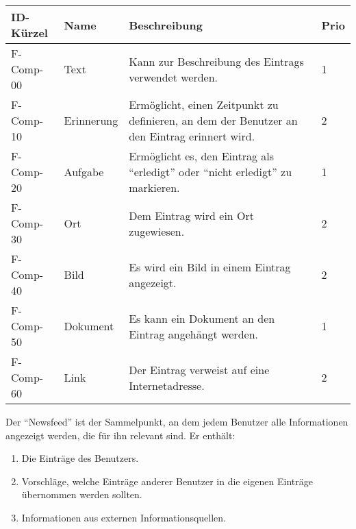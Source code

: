 \begin{tabularx}{\textwidth}{|l|l|X|l|}
    \toprule
    \textbf{ID-Kürzel} & \textbf{Name} & \textbf{Beschreibung} & \textbf{Prio}\\
    \midrule
    \endhead
    \hline
    \caption{Typen von Komponenten}
    \label{funktionen:typen}
    \endfoot
    F-Comp-00 & Text & Kann zur Beschreibung des Eintrags verwendet werden. & 1\\
    F-Comp-10 & Erinnerung & Ermöglicht, einen Zeitpunkt zu definieren, an dem der Benutzer an den Eintrag erinnert wird. & 2 \\
    F-Comp-20 & Aufgabe & Ermöglicht es, den Eintrag als \enquote{erledigt} oder \enquote{nicht erledigt} zu markieren. & 1\\
    F-Comp-30 & Ort & Dem Eintrag wird ein Ort zugewiesen. & 2 \\
    F-Comp-40 & Bild & Es wird ein Bild in einem Eintrag angezeigt. & 2 \\
    F-Comp-50 & Dokument & Es kann ein Dokument an den Eintrag angehängt werden. & 1\\
    F-Comp-60 & Link & Der Eintrag verweist auf eine Internetadresse. & 2\\
\end{tabularx}


%

Der \enquote{Newsfeed} ist der Sammelpunkt, an dem jedem Benutzer alle Informationen angezeigt werden, die für ihn relevant sind. Er enthält:

\begin{enumerate}
    \item Die Einträge des Benutzers.
    \item Vorschläge, welche Einträge anderer Benutzer in die eigenen Einträge übernommen werden sollten.
    \item Informationen aus externen Informationsquellen.
\end{enumerate}

